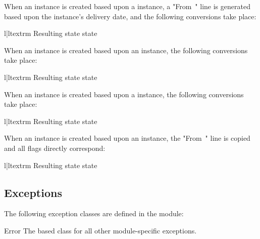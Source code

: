 When an  instance is created based upon a
 instance, a "From~" line is generated based upon the
 instance's delivery date, and the following conversions
take place:

\begin{tableii}{l|l}{textrm}
    {Resulting state}{ state}
\end{tableii}

When an  instance is created based upon an 
instance, the following conversions take place:

\begin{tableii}{l|l}{textrm}
    {Resulting state}{ state}
\end{tableii}

When an  instance is created based upon a
 instance, the following conversions take place:

\begin{tableii}{l|l}{textrm}
    {Resulting state}{ state}
\end{tableii}

When an  instance is created based upon an
 instance, the "From~" line is copied and all flags directly
correspond:

\begin{tableii}{l|l}{textrm}
    {Resulting state}{ state}
\end{tableii}

\subsection{Exceptions}
\label{mailbox-deprecated}

The following exception classes are defined in the  module:

\begin{classdesc}{Error}{}
The based class for all other module-specific exceptions.
\end{classdesc}

